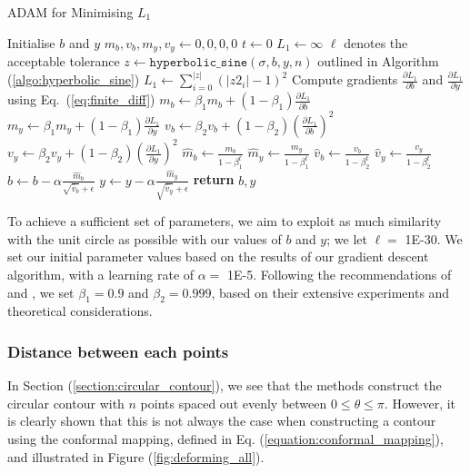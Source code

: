 \documentclass[a4paper]{report}
\begin{document}
\begin{algorithm}[H]
\caption{ADAM for Minimising $L_1$}
\label{algo:adam_l1}
\begin{algorithmic}[1]
\State Initialise $b$ and $y$
\State $m_b, v_b, m_y, v_y \gets 0, 0, 0, 0$
\State $t \gets 0$
\State $L_1 \gets \infty$
 \Comment $\ell$ denotes the acceptable tolerance
\State $z \gets \texttt{hyperbolic\_sine}(\sigma, b, y, n)$ \Comment outlined in Algorithm (\ref{algo:hyperbolic_sine})
        \State $L_1 \gets \sum_{i=0}^{|z|} (|z2_i| - 1)^2$
\State Compute gradients $\frac{\partial L_1}{\partial b}$ and $\frac{\partial L_1}{\partial y}$ \Comment using Eq.~(\ref{eq:finite_diff})
\State $m_b \gets \beta_1 m_b + (1 - \beta_1) \frac{\partial L_1}{\partial b}$
\State $m_y \gets \beta_1 m_y + (1 - \beta_1) \frac{\partial L_1}{\partial y}$
\State $v_b \gets \beta_2 v_b + (1 - \beta_2) (\frac{\partial L_1}{\partial b})^2$
\State $v_y \gets \beta_2 v_y + (1 - \beta_2) (\frac{\partial L_1}{\partial y})^2$
\State $\hat{m}_b \gets \frac{m_b}{1 - \beta_1^t}$
\State $\hat{m}_y \gets \frac{m_y}{1 - \beta_1^t}$
\State $\hat{v}_b \gets \frac{v_b}{1 - \beta_2^t}$
\State $\hat{v}_y \gets \frac{v_y}{1 - \beta_2^t}$
\State $b \gets b - \alpha \frac{\hat{m}_b}{\sqrt{\hat{v}_b} + \epsilon}$
\State $y \gets y - \alpha \frac{\hat{m}_y}{\sqrt{\hat{v}_y} + \epsilon}$
\EndWhile
\State \textbf{return} $b, y$
\EndProcedure
\end{algorithmic}
\end{algorithm}

To achieve a sufficient set of parameters, we aim to exploit as much similarity with the unit circle as possible with our values of $b$ and $y$; we let $\ell = $ 1E-30. We set our initial parameter values based on the results of our gradient descent algorithm, with a learning rate of $\alpha =$ 1E-5. Following the recommendations of \citet{kingma2014adam} and \citet{goodfellow2016deep}, we set $\beta_1 = 0.9$ and $\beta_2 = 0.999$, based on their extensive experiments and theoretical considerations.
 
\subsubsection{Distance between each points}\label{section:point_distance}
In Section (\ref{section:circular_contour}), we see that the methods construct the circular contour with $n$ points spaced out evenly between $0 \leq \theta \leq \pi$. However, it is clearly shown that this is not always the case when constructing a contour using the conformal mapping, defined in Eq. (\ref{equation:conformal_mapping}), and illustrated in Figure (\ref{fig:deforming_all}).
\end{document}
